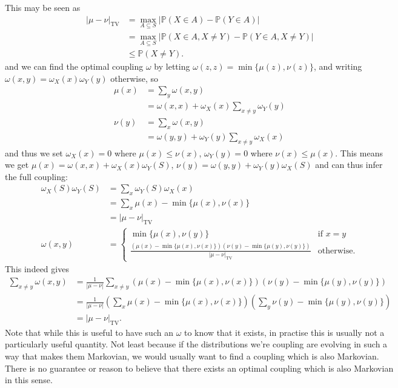 \documentclass{tikzposter} %
\renewcommand{\P}[1]{\mathbb{P}\left(#1\right)}
\begin{document}
\begin{columns}
{    This may be seen as
    \begin{align*}
      |\mu - \nu|_{\mathrm{TV}} &= \max_{A \subseteq S} |\P{X \in A} - \P{Y \in A}| \\
                                &= \max_{A \subseteq S} |\P{X \in A, X \neq Y} - \P{Y \in A, X \neq Y}| \\
      &\le \P{X \neq Y}.
    \end{align*}
    and we can find the optimal coupling $\omega$ by letting $\omega(z, z) = \min \{\mu(z), \nu(z)\}$, and writing $\omega(x, y) = \omega_X(x) \omega_Y(y)$ otherwise, so
    \begin{align*}
      \mu(x) &= \sum_y \omega(x, y) \\
      &= \omega(x, x) + \omega_X(x) \sum_{x \neq y} \omega_Y(y) \\
      \nu(y) &= \sum_x \omega(x, y) \\
             &= \omega(y, y) + \omega_Y(y) \sum_{x \neq y} \omega_X(x)
    \end{align*}
    and thus we set $\omega_X(x) = 0$ where $\mu(x) \le \nu(x)$, $\omega_Y(y) = 0$ where $\nu(x) \le \mu(x)$. This means we get $\mu(x) = \omega(x, x) + \omega_X(x) \omega_Y(S)$, $\nu(y) = \omega(y, y) + \omega_Y(y) \omega_X(S)$ and can thus infer the full coupling:
    \begin{align*}
      \omega_X(S)\omega_Y(S) &= \sum_x \omega_Y(S)\omega_X(x) \\
                             &= \sum_x \mu(x) - \min\{\mu(x), \nu(x)\} \\
      &= |\mu - \nu|_{\mathrm{TV}} \\
      \omega(x, y) &= \begin{cases}
        \min \{\mu(x), \nu(y)\} & \text{if } x = y \\[0.8em]
        \displaystyle \frac{(\mu(x) - \min \{\mu(x), \nu(x)\})(\nu(y) - \min \{\mu(y), \nu(y)\})}{|\mu - \nu|_{\mathrm{TV}}} & \text{otherwise.}
        \end{cases}
    \end{align*}
    This indeed gives
    \begin{align*}
      \sum_{x \neq y} \omega(x, y) &= \frac{1}{|\mu - \nu|}\sum_{x \neq y} (\mu(x) - \min \{\mu(x), \nu(x)\}) (\nu(y) - \min \{\mu(y), \nu(y)\}) \\
                                   &= \frac{1}{|\mu - \nu|} \left(\sum_x \mu(x) - \min\{\mu(x), \nu(x)\}\right) \left(\sum_y \nu(y) - \min\{\mu(y), \nu(y)\}\right) \\
      &= |\mu - \nu|_{\mathrm{TV}}.
    \end{align*}
    Note that while this is useful to have such an $\omega$ to know that it exists, in practise this is usually not a particularly useful quantity. Not least because if the distributions we're coupling are evolving in such a way that makes them Markovian, we would usually want to find a coupling which is also Markovian. There is no guarantee or reason to believe that there exists an optimal coupling which is also Markovian in this sense. \\

}
\end{columns}
\end{document}
